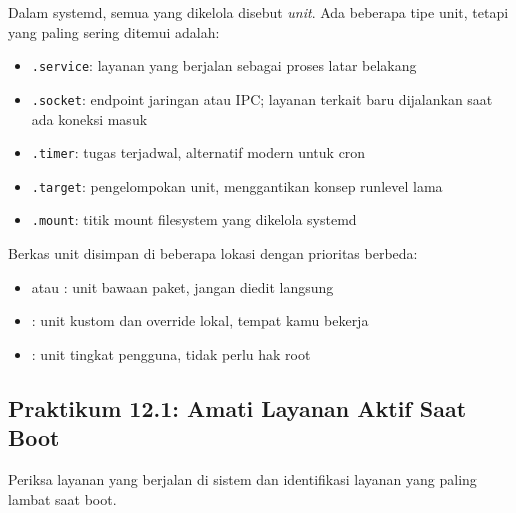 Dalam systemd, semua yang dikelola disebut \textit{unit}. Ada beberapa tipe unit, tetapi yang paling sering ditemui adalah:

\begin{itemize}
    \item \texttt{.service}: layanan yang berjalan sebagai proses latar belakang
    \item \texttt{.socket}: endpoint jaringan atau IPC; layanan terkait baru dijalankan saat ada koneksi masuk
    \item \texttt{.timer}: tugas terjadwal, alternatif modern untuk cron
    \item \texttt{.target}: pengelompokan unit, menggantikan konsep runlevel lama
    \item \texttt{.mount}: titik mount filesystem yang dikelola systemd
\end{itemize}

Berkas unit disimpan di beberapa lokasi dengan prioritas berbeda:

\begin{itemize}
    \item {} atau : unit bawaan paket, jangan diedit langsung
    \item {}: unit kustom dan override lokal, tempat kamu bekerja
    \item {}: unit tingkat pengguna, tidak perlu hak root
\end{itemize}

\subsection*{Praktikum 12.1: Amati Layanan Aktif Saat Boot}

Periksa layanan yang berjalan di sistem dan identifikasi layanan yang paling lambat saat boot.

